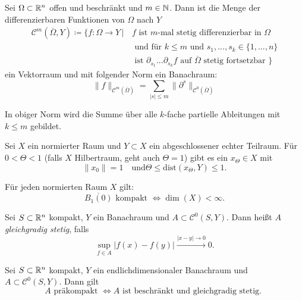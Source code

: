 \documentclass{cheat-sheet}
\newcommand{\dist}{\mathrm{dist}} %
\begin{document}
\begin{defn}
  Sei $\Omega \subset \mathbb{R}^n$ offen und beschränkt und $m \in \mathbb{N}$. Dann ist die Menge der differenzierbaren Funktionen von $\Omega$ nach $Y$
  \begin{align*}
    \mathcal{C}^m(\overline\Omega, Y) \coloneqq \{ f : \Omega \to Y \,|\, & f \text{ ist $m$-mal stetig differenzierbar in $\Omega$ } \\
    & \text{ und für $k \leq m$ und } s_1, ..., s_k \in \{ 1, ..., n \} \\
    & \text{ ist $\partial_{s_1} ... \partial_{s_k} f$ auf $\overline\Omega$ stetig fortsetzbar } \}
  \end{align*}
  ein Vektorraum und mit folgender Norm ein Banachraum:
  \[ \| f \|_{\mathcal{C}^m(\overline\Omega)} = \sum_{|s| \leq m} \| \partial^s \|_{\mathcal{C}^0(\overline\Omega)} \]
\end{defn}

\begin{bem}
  In obiger Norm wird die Summe über alle $k$-fache partielle Ableitungen mit $k \leq m$ gebildet.
\end{bem}


\begin{satz}
  Sei $X$ ein normierter Raum und $Y \subset X$ ein abgeschlossener echter Teilraum. Für $0 < \Theta < 1$ (falls $X$ Hilbertraum, geht auch $\Theta = 1$) gibt es ein $x_{\Theta} \in X$ mit
  \[ \|x_0\| = 1 \quad \text{und} \Theta \leq \dist(x_{\Theta}, Y) \leq 1. \]
\end{satz}

\begin{satz}
  Für jeden normierten Raum $X$ gilt:
  \[ \overline{B_1(0)} \text{ kompakt } \iff \dim(X) < \infty. \]
\end{satz}

\begin{defn}
  Sei $S \subset \mathbb{R}^n$ kompakt, $Y$ ein Banachraum und $A \subset \mathcal{C}^0(S, Y)$. Dann heißt $A$ \emph{gleichgradig stetig}, falls
  \[ \sup_{f \in A} \left| f(x) - f(y) \right| \xrightarrow{\left| x - y \right| \to 0} 0. \]
\end{defn}

\begin{defn}
  Sei $S \subset \mathbb{R}^n$ kompakt, $Y$ ein endlichdimensionaler Banachraum und $A \subset \mathcal{C}^0(S, Y)$. Dann gilt
  \[ A \text{ präkompakt } \iff A \text{ ist beschränkt und gleichgradig stetig. } \]
\end{defn}
\end{document}
